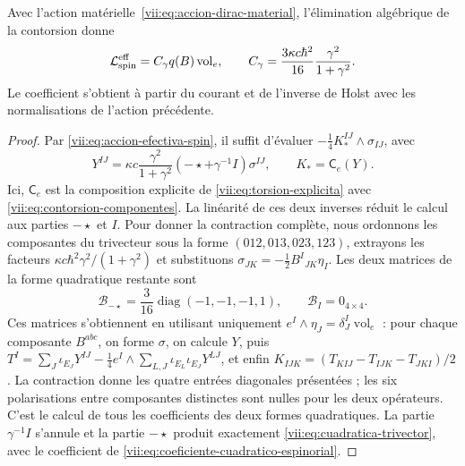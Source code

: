 \begin{theorem}
\label{vii:thm:coeficiente-torsional-espinorial}
Avec l'action matérielle~\eqref{vii:eq:accion-dirac-material},
l'élimination algébrique de la contorsion donne
\begin{equation}
 \mathcal L_{\rm spin}^{\rm eff}
 =C_\gamma q(B)\operatorname{vol}_e,\qquad
 C_\gamma=\frac{3\kappa c\hbar^2}{16}
                      \frac{\gamma^2}{1+\gamma^2}.
 \label{vii:eq:coeficiente-cuadratico-espinorial}
\end{equation}
Le coefficient s'obtient à partir du courant et de l'inverse de Holst
avec les normalisations de l'action précédente.
\end{theorem}
\begin{proof}
Par \eqref{vii:eq:accion-efectiva-spin}, il suffit d'évaluer \(-\frac14K_*^{IJ}\wedge\sigma_{IJ}\), avec
\[
 Y^{IJ}=\kappa c\frac{\gamma^2}{1+\gamma^2}
           (-\star+\gamma^{-1}I)\sigma^{IJ},\qquad
 K_*=\mathsf C_e(Y).
\]
Ici, \(\mathsf C_e\) est la composition explicite de
\eqref{vii:eq:torsion-explicita} avec
\eqref{vii:eq:contorsion-componentes}. La linéarité de ces deux
inverses réduit le calcul aux parties \(-\star\) et \(I\).
Pour donner la contraction complète, nous ordonnons les composantes du
trivecteur sous la forme \((012,013,023,123)\), extrayons les facteurs
\(\kappa c\hbar^2\gamma^2/(1+\gamma^2)\) et substituons
\(\sigma_{JK}=-\frac12B^I{}_{JK}\eta_I\). Les deux matrices
de la forme quadratique restante sont
\begin{equation}
 \mathcal B_{-\star}
 =\frac3{16}\operatorname{diag}(-1,-1,-1,1),\qquad
 \mathcal B_I=0_{4\times4}.
 \label{vii:eq:matrices-contraccion-espinorial}
\end{equation}
Ces matrices s'obtiennent en utilisant uniquement \(e^I\wedge\eta_J=\delta_J^I\operatorname{vol}_e\) : pour chaque composante \(B^{abc}\), on forme \(\sigma\), on calcule \(Y\), puis \(T^I=\sum_J\iota_{E_J}Y^{IJ}
 -\frac14e^I\wedge\sum_{L,J}\iota_{E_L}\iota_{E_J}Y^{LJ}\), et enfin \(K_{IJK}=(T_{KIJ}-T_{IJK}-T_{JKI})/2\). La contraction donne les quatre entrées diagonales présentées ; les six polarisations entre composantes distinctes sont nulles pour les deux opérateurs. C'est le calcul de tous les coefficients des deux formes quadratiques. La partie \(\gamma^{-1}I\) s'annule et la partie \(-\star\) produit exactement \eqref{vii:eq:cuadratica-trivector}, avec le coefficient de \eqref{vii:eq:coeficiente-cuadratico-espinorial}.
\end{proof}

